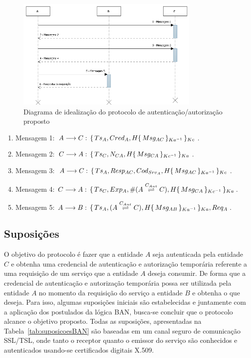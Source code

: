 \begin{figure}[!htb]
    \centering
    \includegraphics[width=0.8\textwidth]{fluxo_autenticacao_BAN.png}
    \caption{Diagrama de idealização do protocolo de autenticação/autorização proposto}
    \label{fig:protocoidealizado}
\end{figure}

\begin{enumerate}
  \item Mensagem 1: ${A}\longrightarrow{C}:\,{\{\,{Ts_A,Cred_A,H{\{\,{Msg_{AC}}\,\}_{Ka ^{-1}}}}\,\}_{Kc}}$.
  \item Mensagem 2: ${C}\longrightarrow{A}:\,{\{\,{Ts_C,{N_{CA}},H{\{\,{Msg_{CA}}\,\}_{Kc ^{-1}}}}\,\}_{Ka}}$.
  \item Mensagem 3: ${A}\longrightarrow{C}:\,{\{\,{Ts_A,{Resp_{AC}},Cod_{Srv_A},H{\{\,{Msg_{AC}}\,\}_{Ka ^{-1}}}}\,\}_{Kc}}$.
  \item Mensagem 4: ${C}\longrightarrow{A}:\,{\{\,{Ts_C,Exp_A,\#({A}\stackrel{{C_{Aut}}}{\rightleftharpoons}{C}),H{\{\,{Msg_{CA}}\,\}_{Kc ^{-1}}}}\,\}_{Ka}}$.
  \item Mensagem 5: ${A}\longrightarrow{B}:\,{\{\,{Ts_A,({A}\stackrel{{C_{Aut}}}{\rightleftharpoons}{C}),H{\{\,{Msg_{AB}}\,\}_{Ka ^{-1}}}}\,\}_{Ka}},{Req_A}$.
\end{enumerate}
\subsection{Suposições}\label{sec:Suposicoes}
O objetivo do protocolo é fazer que a entidade ${A}$ seja autenticada pela entidade ${C}$ e obtenha uma credencial de autenticação e autorização temporária referente a uma requisição de um serviço que a entidade ${A}$ deseja consumir. De forma que a credencial de autenticação e autorização temporária  possa ser utilizada pela entidade ${A}$ no momento da requisição do serviço a entidade ${B}$ e obtenha o que deseja. Para isso, algumas suposições iniciais são estabelecidas e juntamente com a aplicação  dos postulados da lógica BAN, busca-se concluir que o protocolo alcance o objetivo proposto. Todas as suposições, apresentadas na Tabela~\ref{tab:suposicoesBAN} são baseadas em um canal seguro de comunicação SSL/TSL, onde tanto o receptor  quanto o emissor do serviço são conhecidos e autenticados usando-se certificados digitais X.509.

